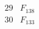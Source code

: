 \documentclass{article}
\begin{document}
{$$\begin{array}{|r|*{7}{r|}}
 & 
 & 
 & 
 & 
\\
\hline
29 
 & F_{138} &
 & 
 & 
 & 
 & 
 & 
\\
\hline
30 
 & F_{133} &
 & 
 & 
 & 
 & 
 & 

\end{array}$$}
\end{document}
